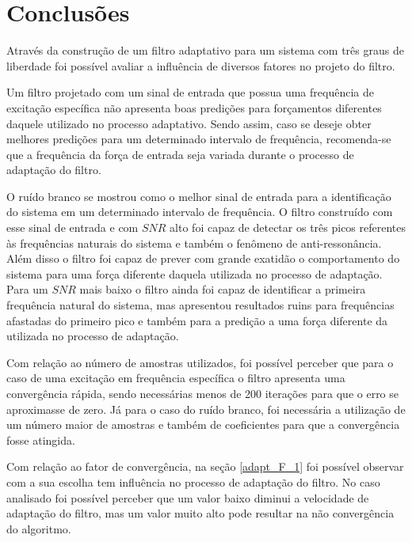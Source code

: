 \chapter{Conclusões}

Através da construção de um filtro adaptativo para um sistema com três graus de liberdade foi possível avaliar a influência de diversos fatores no projeto do filtro.

Um filtro projetado com um sinal de entrada que possua uma frequência de excitação específica não apresenta boas predições para forçamentos diferentes daquele utilizado no processo adaptativo. Sendo assim, caso se deseje obter melhores predições para um determinado intervalo de frequência, recomenda-se que a frequência da força de entrada seja variada durante o processo de adaptação do filtro.

O ruído branco se mostrou como o melhor sinal de entrada para a identificação do sistema em um determinado intervalo de frequência. O filtro construído com esse sinal de entrada e com $ SNR $ alto foi capaz de detectar os três picos referentes às frequências naturais do sistema e também o fenômeno de anti-ressonância. Além disso o filtro foi capaz de prever com grande exatidão o comportamento do sistema para uma força diferente daquela utilizada no processo de adaptação. Para um $ SNR $ mais baixo o filtro ainda foi capaz de identificar a primeira frequência natural do sistema, mas apresentou resultados ruins para frequências afastadas do primeiro pico e também para a predição a uma força diferente da utilizada no processo de adaptação.

Com relação ao número de amostras utilizados, foi possível perceber que para o caso de uma excitação em frequência específica o filtro apresenta uma convergência rápida, sendo necessárias menos de 200 iterações para que o erro se aproximasse de zero. Já para o caso do ruído branco, foi necessária a utilização de um número maior de amostras e também de coeficientes para que a convergência fosse atingida.

Com relação ao fator de convergência, na seção \ref{adapt_F_1} foi possível observar com a sua escolha tem influência no processo de adaptação do filtro. No caso analisado foi possível perceber que um valor baixo diminui a velocidade de adaptação do filtro, mas um valor muito alto pode resultar na não convergência do algoritmo.
